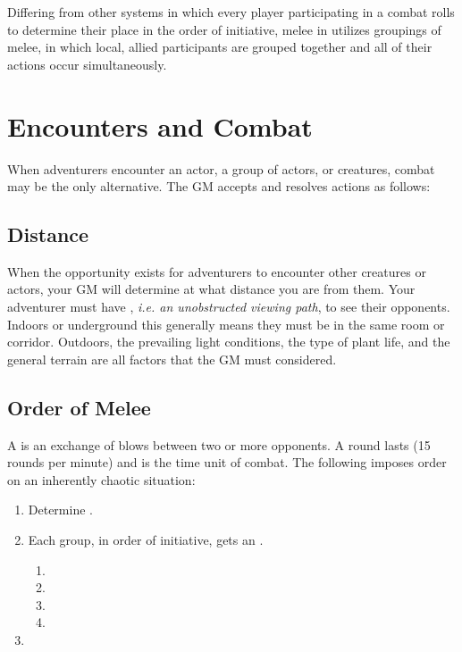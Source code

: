 \begin{multicols}{2}
Differing from other systems in which every player participating in a combat rolls to determine their place in the order of initiative, melee in \aq utilizes groupings of melee, in which local, allied participants are grouped together and all of their actions occur simultaneously.
\section{Encounters and Combat}
\label{encounter}
When adventurers encounter an actor, a group of actors, or creatures, combat may be the only alternative. The GM accepts and resolves  actions as follows:
\subsection{Distance}
When the opportunity exists for adventurers to encounter other creatures or actors, your GM will determine at what distance you are from them. Your adventurer must have , \textit{i.e. an unobstructed viewing path}, to see their opponents. Indoors or underground this generally means they must be in the same room or corridor. Outdoors, the prevailing light conditions, the type of plant life, and the general terrain are all factors that the GM must considered.
\subsection{Order of Melee}
A  is an exchange of blows between two or more opponents. A round lasts  (15 rounds per minute) and is the time unit of combat. The following  imposes order on an inherently chaotic situation:
\begin{enumerate}
\item Determine .
\item Each group, in order of initiative, gets an .
\begin{enumerate}
\item {}
\item {}
\item {}
\item {}
\end{enumerate}
\item {}
\end{enumerate}

\end{multicols}
